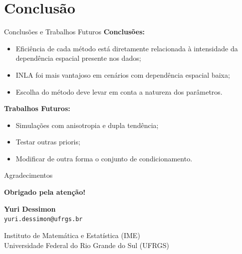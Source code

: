 \documentclass{beamer}
\begin{document}
    \section{Conclusão}

    \begin{frame}{Conclusões e Trabalhos Futuros}
            \textbf{Conclusões:}
            \begin{itemize}
                \item Eficiência de cada método está diretamente relacionada à intensidade da dependência espacial presente nos dados;
                \item INLA foi mais vantajoso em cenários com dependência espacial baixa;
                \item Escolha do método deve levar em conta a natureza dos parâmetros.
            \end{itemize}
        \textbf{Trabalhos Futuros:}
        \begin{itemize}
            \item Simulações com anisotropia e dupla tendência;
            \item Testar outras prioris;
            \item Modificar de outra forma o conjunto de condicionamento.
        \end{itemize} 
    \end{frame}

    \begin{frame}{Agradecimentos}
        \begin{center}
            \vspace{1cm}
            {\Large \textbf{Obrigado pela atenção!}}
            
            \vspace{0.8cm}
            \textbf{Yuri Dessimon} \\
            \texttt{yuri.dessimon@ufrgs.br}
            
            \vspace{0.5cm}
            \small Instituto de Matemática e Estatística (IME) \\
            Universidade Federal do Rio Grande do Sul (UFRGS)
        \end{center}
    \end{frame}

    
\end{document}
